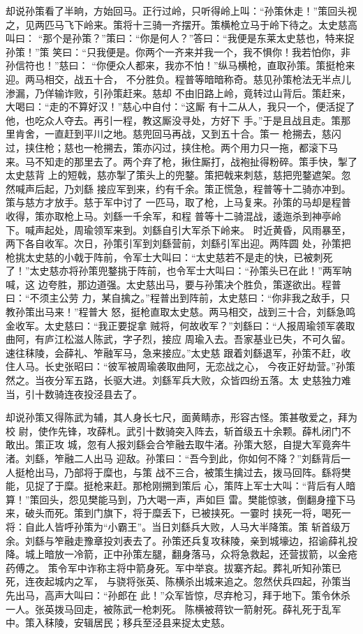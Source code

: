 却说孙策看了半晌，方始回马。正行过岭，只听得岭上叫：“孙策休走！”策回头视
之，见两匹马飞下岭来。策将十三骑一齐摆开。策横枪立马于岭下待之。太史慈高叫曰：
“那个是孙策？”策曰：“你是何人？”答曰：“我便是东莱太史慈也，特来捉孙策！”策
笑曰：“只我便是。你两个一齐来并我一个，我不惧你！我若怕你，非孙信符也！”慈曰：
“你便众人都来，我亦不怕！”纵马横枪，直取孙策。策挺枪来迎。两马相交，战五十合，
不分胜负。程普等暗暗称奇。慈见孙策枪法无半点儿渗漏，乃佯输诈败，引孙策赶来。慈却
不由旧路上岭，竟转过山背后。策赶来，大喝曰：“走的不算好汉！”慈心中自付：“这厮
有十二从人，我只一个，便活捉了他，也吃众人夺去。再引一程，教这厮没寻处，方好下
手。”于是且战且走。策那里肯舍，一直赶到平川之地。慈兜回马再战，又到五十合。策一
枪搠去，慈闪过，挟住枪；慈也一枪搠去，策亦闪过，挟住枪。两个用力只一拖，都滚下马
来。马不知走的那里去了。两个弃了枪，揪住厮打，战袍扯得粉碎。策手快，掣了太史慈背
上的短戟，慈亦掣了策头上的兜鍪。策把戟来刺慈，慈把兜鍪遮架。忽然喊声后起，乃刘繇
接应军到来，约有千余。策正慌急，程普等十二骑亦冲到。策与慈方才放手。慈于军中讨了
一匹马，取了枪，上马复来。孙策的马却是程普收得，策亦取枪上马。刘繇一千余军，和程
普等十二骑混战，逶迤杀到神亭岭下。喊声起处，周瑜领军来到。刘繇自引大军杀下岭来。
时近黄昏，风雨暴至，两下各自收军。次日，孙策引军到刘繇营前，刘繇引军出迎。两阵圆
处，孙策把枪挑太史慈的小戟于阵前，令军士大叫曰：“太史慈若不是走的快，已被刺死
了！”太史慈亦将孙策兜鍪挑于阵前，也令军士大叫曰：“孙策头已在此！”两军呐喊，这
边夸胜，那边道强。太史慈出马，要与孙策决个胜负，策遂欲出。程普曰：“不须主公劳
力，某自擒之。”程普出到阵前，太史慈曰：“你非我之敌手，只教孙策出马来！”程普大
怒，挺枪直取太史慈。两马相交，战到三十合，刘繇急鸣金收军。太史慈曰：“我正要捉拿
贼将，何故收军？”刘繇曰：“人报周瑜领军袭取曲阿，有庐江松滋人陈武，字子烈，接应
周瑜入去。吾家基业已失，不可久留。速往秣陵，会薛礼、笮融军马，急来接应。”太史慈
跟着刘繇退军，孙策不赶，收住人马。长史张昭曰：“彼军被周瑜袭取曲阿，无恋战之心，
今夜正好劫营。”孙策然之。当夜分军五路，长驱大进。刘繇军兵大败，众皆四纷五落。太
史慈独力难当，引十数骑连夜投泾县去了。

却说孙策又得陈武为辅，其人身长七尺，面黄睛赤，形容古怪。策甚敬爱之，拜为校
尉，使作先锋，攻薛札。武引十数骑突入阵去，斩首级五十余颗。薛札闭门不敢出。策正攻
城，忽有人报刘繇会合笮融去取牛渚。孙策大怒，自提大军竟奔牛渚。刘繇，笮融二人出马
迎敌。孙策曰：“吾今到此，你如何不降？”刘繇背后一人挺枪出马，乃部将于糜也，与策
战不三合，被策生擒过去，拨马回阵。繇将樊能，见捉了于糜。挺枪来赶。那枪刚搠到策后
心，策阵上军士大叫：“背后有人暗算！”策回头，怨见樊能马到，乃大喝一声，声如巨
雷。樊能惊骇，倒翻身撞下马来，破头而死。策到门旗下，将于糜丢下，已被挟死。一霎时
挟死一将，喝死一将：自此人皆呼孙策为“小霸王”。当日刘繇兵大败，人马大半降策。策
斩首级万余。刘繇与笮融走豫章投刘表去了。孙策还兵复攻秣陵，亲到城壕边，招谕薛礼投
降。城上暗放一冷箭，正中孙策左腿，翻身落马，众将急救起，还营拔箭，以金疮药傅之。
策令军中诈称主将中箭身死。军中举哀。拔寨齐起。葬礼听知孙策已死，连夜起城内之军，
与骁将张英、陈横杀出城来追之。忽然伏兵四起，孙策当先出马，高声大叫曰：“孙郎在
此！”众军皆惊，尽弃枪习，拜于地下。策令休杀一人。张英拨马回走，被陈武一枪刺死。
陈横被蒋钦一箭射死。薛礼死于乱军中。策入秣陵，安辑居民；移兵至泾县来捉太史慈。

